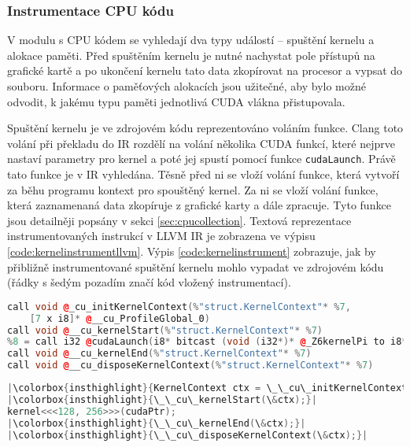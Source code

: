 \subsubsection*{Instrumentace CPU kódu}
V modulu s CPU kódem se vyhledají dva typy událostí -- spuštění kernelu a alokace paměti. Před spuštěním kernelu je nutné nachystat pole přístupů na grafické kartě a po ukončení kernelu tato data zkopírovat na procesor a vypsat do souboru. Informace o paměťových alokacích jsou užitečné, aby bylo možné odvodit, k jakému typu paměti jednotlivá CUDA vlákna přistupovala.

Spuštění kernelu je ve zdrojovém kódu reprezentováno voláním funkce. Clang toto volání při překladu do IR rozdělí na volání několika CUDA funkcí, které nejprve nastaví parametry pro kernel a poté jej spustí pomocí funkce \texttt{cudaLaunch}. Právě tato funkce je v IR vyhledána. Těsně před ni se vloží volání funkce, která vytvoří za běhu programu kontext pro spouštěný kernel. Za ni se vloží volání funkce, která zaznamenaná data zkopíruje z grafické karty a dále zpracuje. Tyto funkce jsou detailněji popsány v sekci \ref{sec:cpucollection}. Textová reprezentace instrumentovaných instrukcí v LLVM IR je zobrazena ve výpisu \ref{code:kernelinstrumentllvm}. Výpis \ref{code:kernelinstrument} zobrazuje, jak by přibližně instrumentované spuštění kernelu mohlo vypadat ve zdrojovém kódu (řádky s šedým pozadím značí kód vložený instrumentací).
    
\begin{lstlisting}[language=C++,
caption=Instrumentace spuštění kernelu v LLVM IR,
label={code:kernelinstrumentllvm}]
%7 = alloca %"struct.KernelContext"
call void @_cu_initKernelContext(%"struct.KernelContext"* %7,
    [7 x i8]* @__cu_ProfileGlobal_0)
call void @__cu_kernelStart(%"struct.KernelContext"* %7)
%8 = call i32 @cudaLaunch(i8* bitcast (void (i32*)* @_Z6kernelPi to i8*))
call void @__cu_kernelEnd(%"struct.KernelContext"* %7)
call void @__cu_disposeKernelContext(%"struct.KernelContext"* %7)
\end{lstlisting}

\begin{minipage}{\linewidth}
\begin{lstlisting}[language=C++,
caption=Instrumentace spuštění kernelu v C++,
label={code:kernelinstrument},
escapechar=|]
|\colorbox{insthighlight}{KernelContext ctx = \_\_cu\_initKernelContext(\textcolor[RGB]{163,21,21}{\textquotedbl kernel\textquotedbl});}|
|\colorbox{insthighlight}{\_\_cu\_kernelStart(\&ctx);}|
kernel<<<128, 256>>>(cudaPtr);
|\colorbox{insthighlight}{\_\_cu\_kernelEnd(\&ctx);}|
|\colorbox{insthighlight}{\_\_cu\_disposeKernelContext(\&ctx);}|
\end{lstlisting}
\end{minipage}

